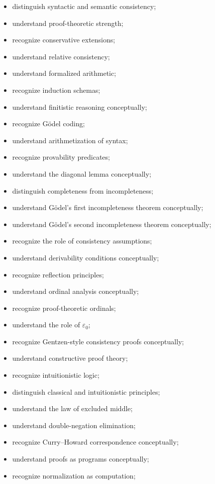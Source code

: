 {\begin{itemize}
    \item distinguish syntactic and semantic consistency;
    \item understand proof-theoretic strength;
    \item recognize conservative extensions;
    \item understand relative consistency;
    \item understand formalized arithmetic;
    \item recognize induction schemas;
    \item understand finitistic reasoning conceptually;
    \item recognize Gödel coding;
    \item understand arithmetization of syntax;
    \item recognize provability predicates;
    \item understand the diagonal lemma conceptually;
    \item distinguish completeness from incompleteness;
    \item understand Gödel's first incompleteness theorem conceptually;
    \item understand Gödel's second incompleteness theorem conceptually;
    \item recognize the role of consistency assumptions;
    \item understand derivability conditions conceptually;
    \item recognize reflection principles;
    \item understand ordinal analysis conceptually;
    \item recognize proof-theoretic ordinals;
    \item understand the role of \(\varepsilon_0\);
    \item recognize Gentzen-style consistency proofs conceptually;
    \item understand constructive proof theory;
    \item recognize intuitionistic logic;
    \item distinguish classical and intuitionistic principles;
    \item understand the law of excluded middle;
    \item understand double-negation elimination;
    \item recognize Curry--Howard correspondence conceptually;
    \item understand proofs as programs conceptually;
    \item recognize normalization as computation;

\end{itemize}}
